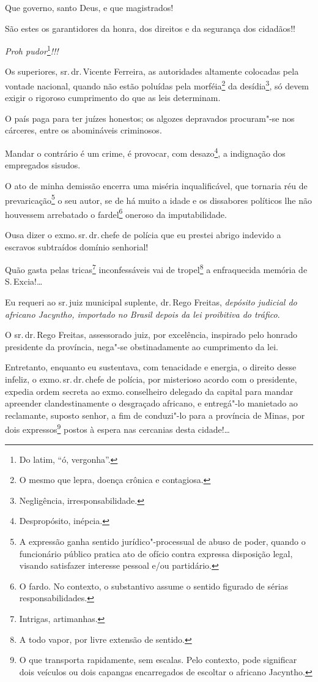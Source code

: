 Que governo, santo Deus, e que magistrados!

São estes os garantidores da honra, dos direitos e da segurança dos
cidadãos!!

\emph{Proh pudor}\footnote{Do latim, ``ó, vergonha''.}\emph{!!!}

Os superiores, sr.\,dr.\,Vicente Ferreira, as autoridades altamente
colocadas pela vontade nacional, quando não estão poluídas pela
morféia\footnote{O mesmo que lepra, doença crônica e contagiosa.} da
desídia\footnote{Negligência, irresponsabilidade.}, só devem exigir o
rigoroso cumprimento do que as leis determinam.

O país paga para ter juízes honestos; os algozes depravados procuram"-se
nos cárceres, entre os abomináveis criminosos.

Mandar o contrário é um crime, é provocar, com desazo\footnote{
  Despropósito, inépcia.}, a indignação dos empregados sisudos.

O ato de minha demissão encerra uma miséria inqualificável, que tornaria
réu de prevaricação\footnote{A expressão ganha sentido
  jurídico"-processual de abuso de poder, quando o funcionário público
  pratica ato de ofício contra expressa disposição legal, visando
  satisfazer interesse pessoal e/ou partidário.} o seu autor, se de há
muito a idade e os dissabores políticos lhe não houvessem arrebatado o
fardel\footnote{O fardo. No contexto, o substantivo assume o
  sentido figurado de sérias responsabilidades.} oneroso da
imputabilidade.

Ousa dizer o exmo.\,sr.\,dr.\,chefe de polícia que eu prestei abrigo
indevido a escravos subtraídos domínio senhorial!

Quão gasta pelas tricas\footnote{Intrigas, artimanhas.} inconfessáveis
vai de tropel\footnote{A todo vapor, por livre extensão de sentido.} a
enfraquecida memória de S.\,Excia!\ldots{}

Eu requeri ao sr.\,juiz municipal suplente, dr.\,Rego Freitas,
\emph{depósito judicial do africano Jacyntho, importado no Brasil depois
da lei proibitiva do tráfico}.

O sr.\,dr.\,Rego Freitas, assessorado juiz, por excelência, inspirado pelo
honrado presidente da província, nega"-se obstinadamente ao cumprimento
da lei.

Entretanto, enquanto eu sustentava, com tenacidade e energia, o direito
desse infeliz, o exmo.\,sr.\,dr.\,chefe de polícia, por misterioso acordo
com o presidente, expedia ordem secreta ao exmo.\,conselheiro delegado da
capital para mandar apreender clandestinamente o desgraçado africano, e
entregá"-lo manietado ao reclamante, suposto senhor, a fim de conduzi"-lo
para a província de Minas, por dois expressos\footnote{O que
  transporta rapidamente, sem escalas. Pelo contexto, pode significar
  dois veículos ou dois capangas encarregados de escoltar o africano
  Jacyntho.} postos à espera nas cercanias desta cidade!\ldots{}

